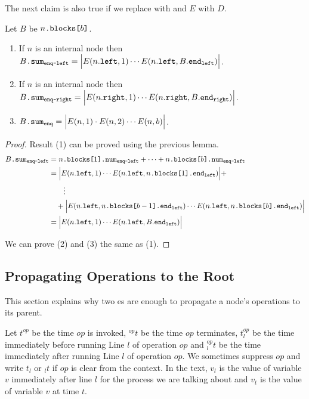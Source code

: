 \documentclass[acmsmall,nonacm,anonymous]{acmart}
\newcommand{\sub}[1]{\textsubscript{#1}}
\newcommand{\nf}[1]{{\normalfont{\texttt{#1}}}}
\begin{document}
The next claim is also true if we replace \nf{enq} with \nf{deq} and $E$ with $D$.
\begin{corollary}\label{lem::sumX}
Let $B$ be $n\nf{.blocks[}b\nf{]}$.
\begin{enumerate}[label=(\arabic*)]
    \item If $n$ is an internal node then $B\nf{.sum\sub{enq-left}}=\Big|E(n.\nf{left},1)\cdots E(n.\nf{left},B.\nf{end\sub{left}})\Big|$.
    \item If $n$ is an internal node then $B\nf{.sum\sub{enq-right}}=\Big|E(n.\nf{right},1)\cdots E(n.\nf{right},B.\nf{end\sub{right}})\Big|$.
    \item $B\nf{.sum\sub{enq}}=\Big|E(n,1)\cdot E(n,2)\cdots E(n,b)\Big|$.
\end{enumerate}
\end{corollary}
\begin{proof} Result (1) can be proved using the previous lemma.
\begin{align*}
    B\nf{.sum\sub{enq-left}}&=n\nf{.blocks[}1\nf{].num\sub{enq-left}}+\dots+ n\nf{.blocks[}b\nf{].num\sub{enq-left}}\\
    &=\Big|E(n.\nf{left},1)\cdots E(n.\nf{left},n\nf{.blocks[}1\nf{].end\sub{left}})\Big| +\\
    &\hspace{2em}\vdots\\
    &\quad+\Big|E(n.\nf{left},n\nf{.blocks[}b-1\nf{].end\sub{left}})\cdots E(n.\nf{left},n\nf{.blocks[}b\nf{].end\sub{left}})\Big|\\
    &=\Big|E(n.\nf{left},1)\cdots E(n.\nf{left},B.\nf{end\sub{left}})\Big|
\end{align*}

We can prove (2) and (3) the same as (1).
\end{proof}


\subsection{Propagating Operations to the Root}
This section explains why two \nf{Refresh}es are enough to propagate a node's operations to its parent.

\begin{definition}
Let $t^{op}$ be the time $op$ is invoked, $^{op}t$ be the time $op$ terminates, $t_{l}^{op}$ be the time immediately before running Line $l$ of operation $op$ and $^{op}_{l}t$ be the time immediately after running Line $l$ of operation $op$. We sometimes suppress $op$ and write $t_{l}$ or $_l t$ if $op$ is clear from the context. In the text, $v_l$ is the value of variable $v$ immediately after line $l$ for the process we are talking about and $v_t$ is the value of variable $v$ at time $t$.
\end{definition} 
\end{document}
